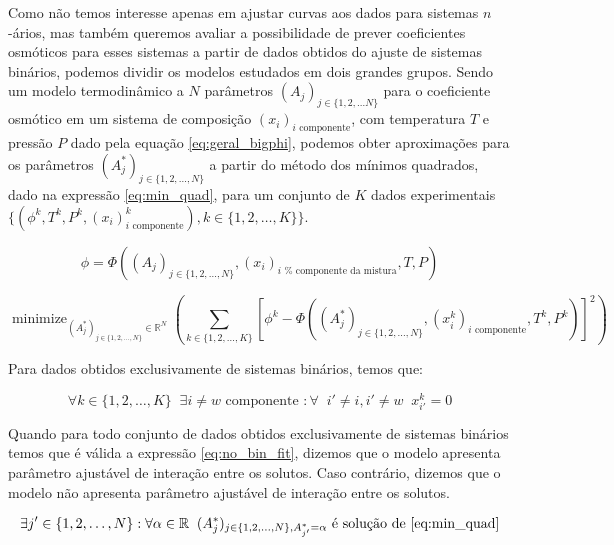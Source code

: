 \documentclass[
	12pt,				%
	openright,
	twoside,
	a4paper,			%
	brazil,			%
	french,				%
	spanish,			%
	english				%
	]{abntex2}
\DeclareMathOperator*{\minimize}{minimize}
\begin{document}
Como não temos interesse apenas em ajustar curvas aos dados para sistemas
$n$-ários, mas também queremos avaliar a possibilidade de prever coeficientes
osmóticos para esses sistemas a partir de dados obtidos do ajuste de sistemas
binários, podemos dividir os modelos estudados em dois grandes grupos. Sendo um
modelo termodinâmico a $N$ parâmetros $(A_j)_{j \in \{1, 2, \ldots N\}}$ para o
coeficiente osmótico em um sistema de composição $(x_i)_\text{$i$ componente}$,
com temperatura $T$ e pressão $P$ dado pela equação \ref{eq:geral_bigphi},
podemos obter aproximações para os parâmetros $(A_j^*)_{j \in \{1, 2, \ldots, N\}}$
a partir do método dos mínimos quadrados, dado na expressão \ref{eq:min_quad},
para um conjunto de $K$ dados experimentais $\{(\phi^k, T^k, P^k,%
	(x_i)^k_\text{$i$ componente}), k \in \{1,2,\ldots,K\}\}$.

\begin{equation}
	\label{eq:geral_bigphi}
	\phi = \Phi((A_j)_{j \in \{1, 2, \ldots, N\}}, (x_i)_\text{$i$ %
		componente da mistura}, T, P)
\end{equation}

\begin{equation}
	\label{eq:min_quad}
	\minimize_{(A_j^*)_{j \in \{1,2,\ldots,N\}} \in \mathbb{R}^N}%
	\left(\sum_{k \in \{1,2,\ldots,K\}}\left[\phi^k - \Phi((A^*_j)_{j%
	\in \{1, 2, \ldots, N\}}, (x^k_i)_\text{$i$ componente},%
	T^k, P^k)\right]^2\right)
\end{equation}

Para dados obtidos exclusivamente de sistemas binários, temos que:

\begin{equation}
	\forall k \in \{1,2,\ldots,K\} \;\; \exists i \neq w%
	\text{ componente } : \forall \;\; i' \neq i, i' \neq w\;\; x^k_{i'} = 0
\end{equation}

Quando para todo conjunto de dados obtidos exclusivamente de sistemas binários
temos que é válida a expressão \ref{eq:no_bin_fit},
dizemos que o modelo apresenta parâmetro ajustável de interação entre os
solutos. Caso contrário, dizemos que o modelo não apresenta parâmetro
ajustável de interação entre os solutos.

\begin{equation}
	\label{eq:no_bin_fit}
	\exists j' \in \{1,2,\ldots,N\} : \forall \alpha \in \mathbb{R}\;\;%
	(A_j^*)_{j \in \{1,2,\ldots,N\}, A_{j'}^* = \alpha}%
	\text{ é solução de \ref{eq:min_quad}}
\end{equation}
\end{document}
